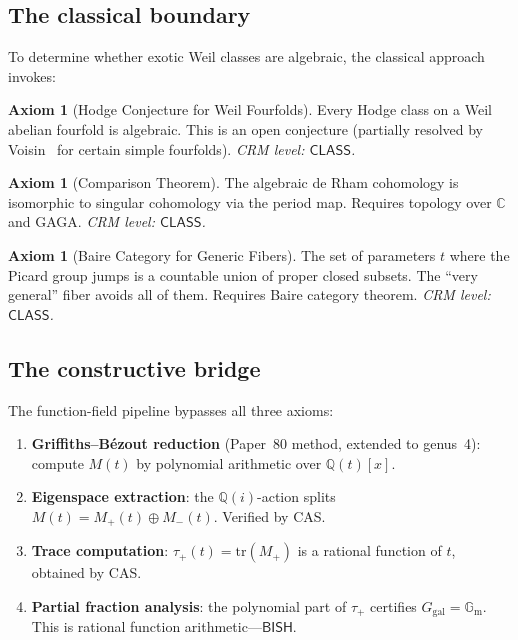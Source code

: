 \documentclass[11pt]{article}
\theoremstyle{plain}
\theoremstyle{definition}
\newtheorem{axiombox}[theorem]{Axiom}
\theoremstyle{remark}
\newcommand{\Q}{\mathbb{Q}}
\newcommand{\C}{\mathbb{C}}
\newcommand{\tr}{\mathrm{tr}}
\newcommand{\Ggal}{G_{\mathrm{gal}}}
\newcommand{\Gm}{\mathbb{G}_{\mathrm{m}}}
\newcommand{\BISH}{\ensuremath{\mathsf{BISH}}}
\newcommand{\CLASS}{\ensuremath{\mathsf{CLASS}}}
\begin{document}
\subsection{The classical boundary}

To determine whether exotic Weil classes are algebraic, the classical
approach invokes:

\begin{axiombox}[Hodge Conjecture for Weil Fourfolds]\label{ax:hodge}
Every Hodge class on a Weil abelian fourfold is algebraic.
This is an open conjecture (partially resolved by Voisin~\cite{Voisin2024}
for certain simple fourfolds). \emph{CRM level: \CLASS.}
\end{axiombox}

\begin{axiombox}[Comparison Theorem]\label{ax:comparison}
The algebraic de Rham cohomology is isomorphic to singular cohomology
via the period map. Requires topology over $\C$ and GAGA.
\emph{CRM level: \CLASS.}
\end{axiombox}

\begin{axiombox}[Baire Category for Generic Fibers]\label{ax:baire}
The set of parameters $t$ where the Picard group jumps is a countable
union of proper closed subsets. The ``very general'' fiber avoids all of them.
Requires Baire category theorem. \emph{CRM level: \CLASS.}
\end{axiombox}

\subsection{The constructive bridge}

The function-field pipeline bypasses all three axioms:

\begin{enumerate}[nosep]
\item \textbf{Griffiths--B\'ezout reduction} (Paper~80 method, extended
  to genus~4): compute $M(t)$ by polynomial arithmetic over $\Q(t)[x]$.
\item \textbf{Eigenspace extraction}: the $\Q(i)$-action splits
  $M(t) = M_+(t) \oplus M_-(t)$. Verified by CAS.
\item \textbf{Trace computation}: $\tau_+(t) = \tr(M_+)$ is a rational
  function of $t$, obtained by CAS.
\item \textbf{Partial fraction analysis}: the polynomial part of $\tau_+$
  certifies $\Ggal = \Gm$. This is rational function arithmetic---\BISH.
\end{enumerate}
\end{document}
